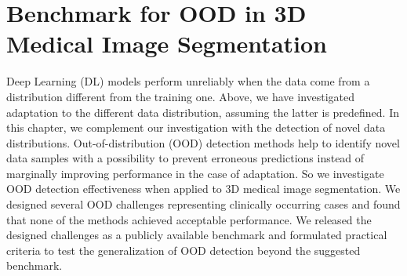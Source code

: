 

\chapter{Benchmark for OOD in 3D Medical Image Segmentation}
\label{chap:ood_bench}


Deep Learning (DL) models perform unreliably when the data come from a distribution different from the training one. Above, we have investigated adaptation to the different data distribution, assuming the latter is predefined. In this chapter, we complement our investigation with the detection of novel data distributions. Out-of-distribution (OOD) detection methods help to identify novel data samples with a possibility to prevent erroneous predictions instead of marginally improving performance in the case of adaptation. So we investigate OOD detection effectiveness when applied to 3D medical image segmentation. We designed several OOD challenges representing clinically occurring cases and found that none of the methods achieved acceptable performance. We released the designed challenges as a publicly available benchmark and formulated practical criteria to test the generalization of OOD detection beyond the suggested benchmark.




